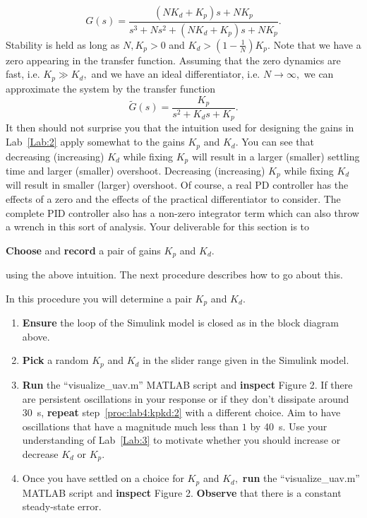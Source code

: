 \[
  G(s) = \frac{\left(N K_d + K_p\right)s + N K_p}{s^3 + N s^2 + \left(N K_d + K_p\right) s + N K_p}.
\]
Stability is held as long as \(N, K_p > 0\) and \(K_d > \left(1 - \frac{1}{N}\right) K_p.\)
Note that we have a zero appearing in the transfer function.
Assuming that the zero dynamics are fast, i.e. \(K_p \gg K_d,\) and we have an ideal differentiator, i.e. \(N \to \infty,\) we can approximate the system by the transfer function
\[
  \tilde{G}(s) = \frac{K_p}{s^2 + K_d s + K_p}.
\]
It then should not surprise you that the intuition used for designing the gains in Lab~\ref{Lab:2} apply somewhat to the gains \(K_p\) and \(K_d.\)
You can see that decreasing (increasing) \(K_d\) while fixing \(K_p\) will result in a larger (smaller) settling time and larger (smaller) overshoot.
Decreasing (increasing) \(K_p\) while fixing \(K_d\) will result in smaller (larger) overshoot.
Of course, a real PD controller has the effects of a zero and the effects of the practical differentiator to consider.
The complete PID controller also has a non-zero integrator term which can also throw a wrench in this sort of analysis.
Your deliverable for this section is to
%
\begin{deliverable}[label={del:lab4:p1:1}]
  \textbf{Choose} and \textbf{record} a pair of gains \(K_p\) and \(K_d.\)
\end{deliverable}
%
using the above intuition.
The next procedure describes how to go about this.
%
\begin{procedure}[label={proc:lab4:kpkd}]
  In this procedure you will determine a pair \(K_p\) and \(K_d.\)
  \begin{enumerate}[label={(\arabic*)}]
    \item{%
      \textbf{Ensure} the loop of the Simulink model is closed as in the block diagram above.
    }
    \item{%
      \textbf{Pick} a random \(K_p\) and \(K_d\) in the slider range given in the Simulink model.
      \label{proc:lab4:kpkd:2}
    }
    \item{%
      \textbf{Run} the ``visualize\_uav.m'' MATLAB script and \textbf{inspect} Figure 2.
      If there are persistent oscillations in your response or if they don't dissipate around \SI{30}{s}, \textbf{repeat} step~\ref{proc:lab4:kpkd:2} with a different choice.
      Aim to have oscillations that have a magnitude much less than \(1\) by \SI{40}{s}.
      Use your understanding of Lab~\ref{Lab:3} to motivate whether you should increase or decrease \(K_d\) or \(K_p.\)
    }
    \item{%
      Once you have settled on a choice for \(K_p\) and \(K_d,\)
      \textbf{run} the ``visualize\_uav.m'' MATLAB script and \textbf{inspect} Figure 2.
      \textbf{Observe} that there is a constant steady-state error.
    }
  \end{enumerate}
\end{procedure}

